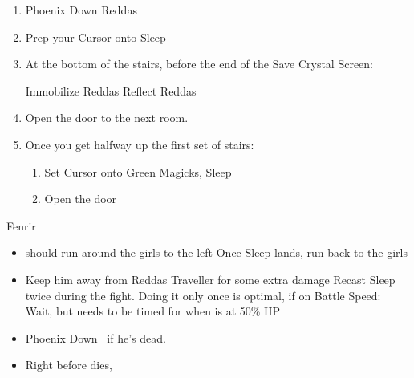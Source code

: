 \begin{enumerate}[resume]
\item Phoenix Down Reddas
\item Prep your Cursor onto Sleep
\item At the bottom of the stairs, before the end of the Save Crystal Screen:
\begin{enumerate}
\penelof Immobilize Reddas
\ashef Reflect Reddas
\end{enumerate}
\item Open the door to the next room.
\item Once you get halfway up the first set of stairs:
\begin{enumerate}
\decoy{\ashe}{\balthier}
\gambiton{\ashe}
\penelof Reflect \balthier
\gambiton{\penelo}
\item Set Cursor onto Green Magicks, Sleep
\item Open the door
\end{enumerate}
\end{enumerate}
\begin{battle}{Fenrir}
	\begin{itemize}
		\balthierf Run backwards diagonal, spam Sleep while running.
		\item {} should run around the girls to the left
		\balthierf Once Sleep lands, run back to the girls
		\item Keep him away from Reddas
	      \balthierf Traveller for some extra damage
	      \balthierf Recast Sleep twice during the fight. Doing it only once is optimal, if on Battle Speed: Wait, but needs to be timed for when  is at 50\% HP
	      \item Phoenix Down \vaan\ if he's dead.
	      \item Right before  dies, \GirlsGambitOff
	\end{itemize}
\end{battle}
